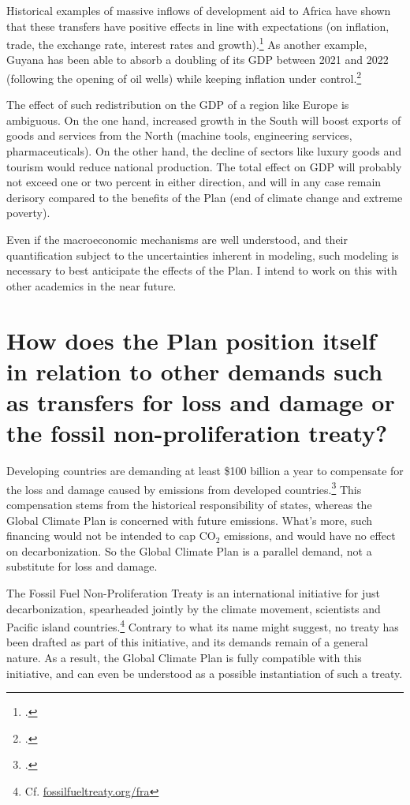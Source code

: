 \documentclass[a5paper,english,openany]{memoir}
\begin{document}
Historical examples of massive inflows of development aid to Africa have shown that these transfers have positive effects in line with expectations (on inflation, trade, the exchange rate, interest rates and growth).\footnote{\citet{berg_macroeconomics_2007,strand_revenue_2009}.} As another example, Guyana has been able to absorb a doubling of its GDP between 2021 and 2022 (following the opening of oil wells) while keeping inflation under control.\footnote{\citet{fmi_guyana_2023}.} 

The effect of such redistribution on the GDP of a region like Europe is ambiguous. On the one hand, increased growth in the South will boost exports of goods and services from the North (machine tools, engineering services, pharmaceuticals). 
On the other hand, the decline of sectors like luxury goods and tourism would reduce national production. 
The total effect on GDP will probably not exceed one or two percent in either direction, and will in any case remain derisory compared to the benefits of the Plan (end of climate change and extreme poverty). 

Even if the macroeconomic mechanisms are well understood, and their quantification subject to the uncertainties inherent in modeling, such modeling is necessary to best anticipate the effects of the Plan. I intend to work on this with other academics in the near future.





\section*{\normalsize How does the Plan position itself in relation to other demands such as transfers for loss and damage or the fossil non-proliferation treaty?}\label{q:climate_movt}

Developing countries are demanding at least \$100 billion a year to compensate for the loss and damage caused by emissions from developed countries.\footnote{\citet{tc_proposal_2023}.} This compensation stems from the historical responsibility of states, whereas the Global Climate Plan is concerned with future emissions. What's more, such financing would not be intended to cap CO$_\text{2}$ emissions, and would have no effect on decarbonization. %
So the Global Climate Plan is a parallel demand, not a substitute for loss and damage.

The Fossil Fuel Non-Proliferation Treaty is an international initiative for just decarbonization, spearheaded jointly by the climate movement, scientists and Pacific island countries.\footnote{Cf. \href{https://fossilfueltreaty.org/fra}{fossilfueltreaty.org/fra}} Contrary to what its name might suggest, no treaty has been drafted as part of this initiative, and its demands remain of a general nature. As a result, the Global Climate Plan is fully compatible with this initiative, and can even be understood as a possible instantiation of such a treaty.
\end{document}
